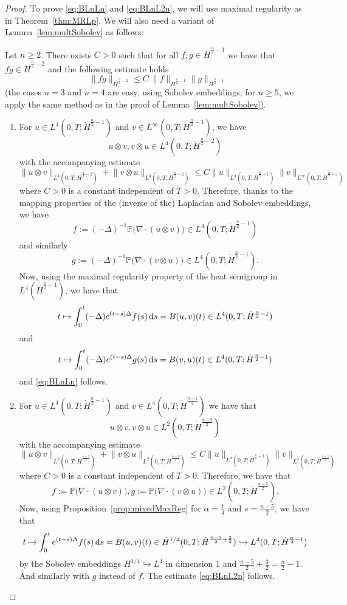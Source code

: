 \documentclass[a4paper, 12pt]{article}
\theoremstyle{plain}
\theoremstyle{definition}
\theoremstyle{remark}
\numberwithin{equation}{section}
\begin{document}
\begin{proof}
To prove \eqref{eq:BLnLn} and \eqref{eq:BLnL2n}, we will use maximal regularity as in 
Theorem~\ref{thm:MRLp}. We will also need a variant of Lemma~\ref{lem:multSobolev} as follows:

Let $n\ge 2$. There exists $C>0$ such that for all $f,g\in \dot H^{\frac{n}{2}-1}$ we have that $fg\in\dot H^{\frac{n}{2}-2}$ and
the following estimate holds
\[
\|fg\|_{\dot H^{\frac{n}{2}-2}}\le C\ \|f\|_{\dot H^{\frac{n}{2}-1}}\|g\|_{\dot H^{\frac{n}{2}-1}}
\]
(the cases $n=3$ and $n=4$ are easy, using Sobolev embeddings; for $n\ge 5$, we apply the same method as in the proof
of Lemma~\ref{lem:multSobolev}).
%
\begin{enumerate}
\item
For $u\in L^4(0,T;\dot H^{\frac{n}{2}-1})$ and $v\in L^\infty(0,T;\dot H^{\frac{n}{2}-1})$, we have
\[
u\otimes v, v\otimes u\in L^4(0,T;\dot H^{\frac{n}{2}-2})
\]
with the accompanying estimate
\[
\bigl\|u\otimes v\bigr\|_{L^4(0,T;\dot H^{\frac{n}{2}-2})}+\bigl\|v\otimes u\bigr\|_{L^4(0,T;\dot H^{\frac{n}{2}-2})}
\le C \|u\|_{L^4(0,T;\dot H^{\frac{n}{2}-1})}\|v\|_{L^\infty(0,T;\dot H^{\frac{n}{2}-1})}
\]
where $C>0$ is a constant independent of $T>0$. Therefore, thanks to the mapping properties
of the (inverse of the) Laplacian and Sobolev embeddings, we have
\[
f:=(-\Delta)^{-1}{\mathbb{P}}\bigl(\nabla\cdot(u\otimes v)\bigr)\in L^4(0,T;\dot H^{\frac{n}{2}-1})
\]
and similarly
\[
g:=(-\Delta)^{-1}{\mathbb{P}}\bigl(\nabla\cdot(v\otimes u)\bigr)
\in L^4(0,T;\dot H^{\frac{n}{2}-1}).
\]
Now, using the maximal regularity property of the heat semigroup in $L^4(\dot H^{\frac{n}{2}-1})$,
we have that
\[
t\mapsto \int_0^t(-\Delta) e^{(t-s)\Delta}f(s)\,{\rm d}s=B(u,v)(t)\in L^4(0,T;\dot H^{\frac{n}{2}-1})
\]
and
\[
t\mapsto \int_0^t(-\Delta) e^{(t-s)\Delta}g(s)\,{\rm d}s=B(v,u)(t)\in L^4(0,T;\dot H^{\frac{n}{2}-1})
\]
and \eqref{eq:BLnLn} follows.
%
\item
For $u\in L^4(0,T;\dot H^{\frac{n}{2}-1})$ and $v\in L^4(0,T;\dot H^{\frac{n-1}{2}})$ we have that
\[
u\otimes v, v\otimes u\in L^2(0,T;\dot H^{\frac{n-3}{2}})
\] 
with the accompanying estimate
\[
\bigl\|u\otimes v\bigr\|_{L^2(0,T;\dot H^{\frac{n-3}{2}})}+\bigl\|v\otimes u\bigr\|_{L^2(0,T;\dot H^{\frac{n-3}{2}})}
\le C \|u\|_{L^4(0,T;\dot H^{\frac{n}{2}-1})}\|v\|_{L^4(0,T;\dot H^{\frac{n-1}{2}})}
\]
where $C>0$ is a constant independent of $T>0$. Therefore, we have that
\[
f:={\mathbb{P}}\bigl(\nabla\cdot(u\otimes v)\bigr),
g:={\mathbb{P}}\bigl(\nabla\cdot(v\otimes u)\bigr) \in L^2(0,T;\dot H^{\frac{n-5}{2}}).
\]
Now, using Proposition~\ref{prop:mixedMaxReg} for $\alpha=\frac{1}{4}$ and $s=\frac{n-5}{2}$,
we have that
\[
t\mapsto \int_0^t e^{(t-s)\Delta} f(s)\,{\rm d}s=B(u,v)(t)
\in \dot H^{1/4}(0,T;\dot H^{\frac{n-5}{2}+\frac{3}{2}})
\hookrightarrow L^4(0,T;\dot H^{\frac{n}{2}-1})
\]
by the Sobolev embeddings  $H^{1/4}\hookrightarrow L^4$ in dimension $1$ and
$\frac{n-5}{2}+\frac{3}{2}=\frac{n}{2}-1$.
And similarly with $g$ instead of $f$. The estimate \eqref{eq:BLnL2n} follows.\qedhere
\end{enumerate}
\end{proof}
\end{document}
